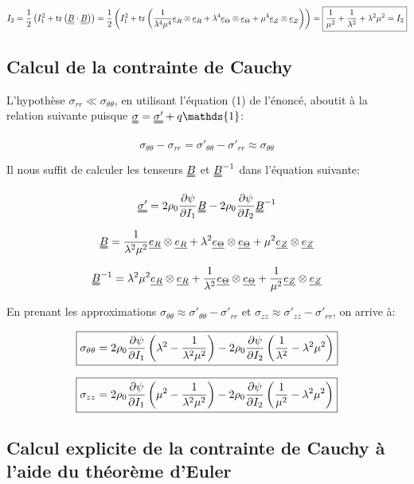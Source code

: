 \documentclass[a4paper,11pt]{article}
\newcommand{\FRAC}{\displaystyle\frac}
\newcommand{\tens}{\uuline}
\newcommand{\diage}[1]{\uline{e_{#1}} \otimes \uline{e_{#1}}}
\begin{document}
$$I_2 = \frac{1}{2}\left(I_1^2+\text{tr}\left(\underline{\underline{B}}\cdot\underline{\underline{B}}\right)\right) = \frac{1}{2}\left(I_1^2+\text{tr}\left( \frac{1}{\lambda^4\mu^4}\underline{e}_R\otimes\underline{e}_R + \lambda^4\underline{e}_\Theta\otimes\underline{e}_\Theta + \mu^4\underline{e}_Z\otimes\underline{e}_Z \right)\right)  = \fbox{$\FRAC{1}{\mu^2}+\frac{1}{\lambda^2}+\lambda^2\mu^2 = I_2$}$$


\subsection{Calcul de la contrainte de Cauchy}

L'hypothèse $\sigma_{rr} \ll \sigma_{\theta\theta}$, en utilisant l'équation (1) de l'énoncé, aboutit à la relation suivante puisque $\tens{\sigma} = \tens{\sigma'} + q \mathds{1}$:

$$\sigma_{\theta\theta} - \sigma_{rr} = \sigma'_{\theta\theta} - \sigma'_{rr} \approx \sigma_{\theta\theta}$$

Il nous suffit de calculer les tenseurs $\tens{B}$ et $\tens{B}^{-1}$ dans l'équation suivante:

$$ \tens{\sigma'} = 2 \rho_0 \frac{\partial\psi}{\partial I_1} \tens {B} - 2 \rho_0 \frac{\partial\psi}{\partial I_2} \tens {B}^{-1}$$

$$ \tens{B} = \frac{1}{\lambda^2\mu^2} \diage{R} + \lambda^2 \diage{\Theta} + \mu^2 \diage{Z} $$

$$ \tens{B}^{-1} = \lambda^2\mu^2 \diage{R} + \frac{1}{\lambda^2} \diage{\Theta} + \frac{1}{\mu^2} \diage{Z} $$

En prenant les approximations $\sigma_{\theta\theta} \approx \sigma'_{\theta\theta} - \sigma'_{rr}$ et $\sigma_{zz} \approx \sigma'_{zz} - \sigma'_{rr}$, on arrive à:

$$\fbox{$\sigma_{\theta\theta} = 2 \rho_0 \FRAC{\partial\psi}{\partial I_1} \left( \lambda^2 - \FRAC{1}{\lambda^2\mu^2} \right) - 2 \rho_0 \FRAC{\partial\psi}{\partial I_2} \left( \FRAC{1}{\lambda^2} - \lambda^2\mu^2 \right)$}$$

$$\fbox{$\sigma_{zz} = 2 \rho_0 \FRAC{\partial\psi}{\partial I_1} \left( \mu^2 - \FRAC{1}{\lambda^2\mu^2} \right) - 2 \rho_0 \FRAC{\partial\psi}{\partial I_2} \left( \FRAC{1}{\mu^2} - \lambda^2\mu^2 \right)$}$$

\subsection{Calcul explicite de la contrainte de Cauchy à l'aide du théorème d'Euler}
\end{document}
